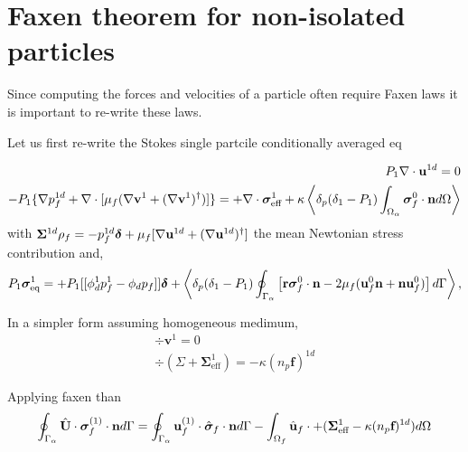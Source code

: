 \section{Faxen theorem for non-isolated particles}


Since computing the forces and velocities of a particle often require Faxen laws it is important to re-write these laws. 


Let us first re-write the Stokes single partcile conditionally averaged eq

\begin{align}
    P_1 \mathbf{\nabla}\cdot \textbf{u}^{1d} = 0 \\
    - P_1\{
        \mathbf{\nabla} p_f^{1d}
        + \mathbf{\nabla}\cdot [\mu_f (\mathbf{\nabla} \textbf{v}^1 + (\mathbf{\nabla} \textbf{v}^1)^\dagger)]
    \}
    = 
    + \mathbf{\nabla}\cdot  \bm\sigma^1_\text{eff}
    + \kappa \left<\delta_{p}  (\delta_1 - P_1) \int_{\Omega_{\alpha}} \bm\sigma_f^0\cdot \textbf{n} d\Omega\right>
\end{align}
with $\bm\Sigma^{1d} \rho_f  = -p_f^{1d} \bm\delta + \mu_f [\mathbf{\nabla} \textbf{u}^{1d}+(\mathbf{\nabla} \textbf{u}^{1d})^\dagger]$ the mean Newtonian stress contribution and, 
\begin{multline*}
    P_1\bm\sigma^1_\text{eq}
    =
    + P_1 [[\phi_d^1 p_f^1 - \phi_d p_f]]\bm\delta 
    + \left<\delta_{p} (\delta_1 - P_1) \oint_{\Gamma_{\alpha}} \left[
        \textbf{r}\bm{\sigma}_f^0 \cdot \textbf{n}
        -  2 \mu_f (\textbf{u}_f^0 \textbf{n} + \textbf{n} \textbf{u}_f^0)
        \right] 
     d\Gamma\right>,
\end{multline*}



In a simpler form assuming homogeneous medimum,
\begin{align}
     \div \textbf{v}^{1} = 0 \\
    \div( \Sigma + \bm\Sigma^1_\text{eff})
    = 
    - \kappa (n_p\textbf{f})^{1d}
\end{align}

Applying faxen than
\begin{equation*}
    \oint_{\Gamma_{\alpha}} \hat{\textbf{U}}\cdot  \bm\sigma_f^{(1)} \cdot \textbf{n} d\Gamma
    = 
    \oint_{\Gamma_{\alpha}} \textbf{u}_f^{(1)}\cdot  \hat{\bm\sigma}_f \cdot \textbf{n} d\Gamma
    - \int_{\Omega_f} \hat{\textbf{u}}_f\cdot + (\bm\Sigma^1_\text{eff} - \kappa (n_p\textbf{f})^{1d}) d\Omega
\end{equation*}
